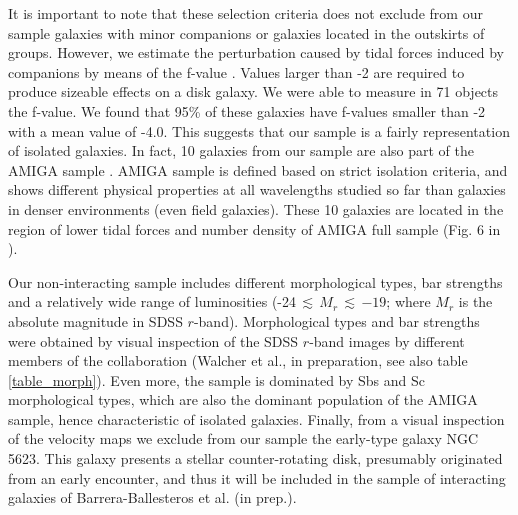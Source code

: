 \documentclass[longauth,traditabstract]{aa}
\begin{document}
It is important to note that these selection criteria does not exclude from our sample galaxies
with minor companions or galaxies located in the outskirts of groups. However, we estimate the perturbation caused by tidal forces induced by companions by means of the f-value \citep{2004A&A...420..873V}. Values larger than -2 are required to produce sizeable effects on a disk galaxy. We were able to measure in 71 objects the f-value. We found that 95\% of these galaxies have f-values smaller than -2 with a mean value of -4.0. This suggests that our sample is a fairly
representation of isolated galaxies. In fact, 10 galaxies from our
sample are also part of the AMIGA sample \citep[Analysis of the interstellar
Medium of Isolated GAlaxies, ][ CALIFA id: 2, 30, 131, 152, 275, 743, 748, 777, 779, 856]{2005A&A...436..443V}. AMIGA sample is defined based on strict isolation criteria, and shows different physical properties at all wavelengths studied so far than galaxies in denser environments (even field galaxies). These 10 galaxies
are located in the region of lower tidal forces and number density of AMIGA full sample (Fig. 6 in \cite{2007A&A...472..121V}).

Our non-interacting sample includes different morphological types, bar strengths and a relatively wide range of  luminosities (-24\,$\lesssim$\,$M_r$\,$\lesssim$\,$-19$; where $M_r$ is the absolute magnitude in SDSS $r$-band). Morphological types and bar strengths were obtained by visual inspection of the SDSS $r$-band images by different members of the collaboration (Walcher et al., in preparation, see also table \ref{table_morph}). Even more, the sample is dominated by Sbs and Sc morphological types, which are also the dominant population of the AMIGA sample,
hence characteristic of isolated galaxies. Finally, from a visual inspection of the velocity maps we exclude from our sample the early-type galaxy NGC\,5623. This galaxy presents a stellar counter-rotating disk, presumably originated from an early encounter, and thus it will be included in the sample of interacting galaxies of Barrera-Ballesteros et al. (in prep.).
\end{document}
